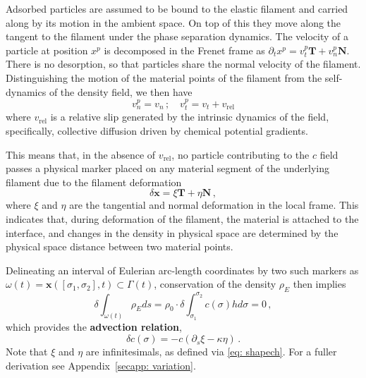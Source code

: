 \documentclass[
aip,
jcp,
reprint, 
floatfix
]{revtex4-1}
\begin{document}
Adsorbed particles are assumed to be bound to the elastic filament and carried along by its motion in the ambient space.  On top of this they move along the tangent to the filament under the phase separation dynamics. The velocity of a particle at position $x^p$ is decomposed in the Frenet frame as
$
\partial_t x^p = v_t^p \mathbf{T} + v_n^p \mathbf{N}.
$
There is no desorption, so that particles share the normal velocity of the filament. Distinguishing the motion of the material points of the filament from the self-dynamics of the density field, we then have
\begin{equation}
    v_n^p = v_n\,; \quad  v_t^p = v_t + v_{\mathrm{rel}}
    \label{eq:vn_particle}
\end{equation}
where $v_{\mathrm{rel}}$ is a relative slip generated by the intrinsic dynamics of the field, specifically, collective diffusion driven by chemical potential gradients. 

This means that, in the absence of $v_{\mathrm{rel}}$, no particle contributing to the $c$ field passes a physical marker placed on any material segment of the underlying filament due to the filament deformation
\begin{equation}
\delta \mathbf{x}=\xi \mathbf{T}+\eta \mathbf{N}\,,\label{eq: shapech}
\end{equation}
where $\xi$ and $\eta$ are the tangential and normal deformation in the local frame. This indicates that, during deformation of the filament, the material is attached to the interface, and changes in the density in physical space are determined by the physical space distance between two material points. 

Delineating an interval of Eulerian arc-length coordinates by two such markers as $\omega(t)=\mathbf{x}([\sigma_1, \sigma_2],t) \subset \Gamma(t)$,
conservation of the density $\rho_E$ then implies
\begin{equation}
\delta \int_{\omega(t)} \rho_E d s=\rho_0 \cdot \delta \int_{\sigma_1}^{\sigma_2} c(\sigma) h d \sigma = 0\,,
\end{equation}
which provides the {\bf advection relation},
\begin{equation}
    \delta  c(\sigma) = -c\left(\partial_s \xi-\kappa \eta\right) \,. \label{eq: exp}
    \end{equation}
Note that $\xi$ and $\eta$ are infinitesimals, as defined via \eqref{eq: shapech}. For a fuller derivation see Appendix~\ref{secapp: variation}. 
\end{document}
